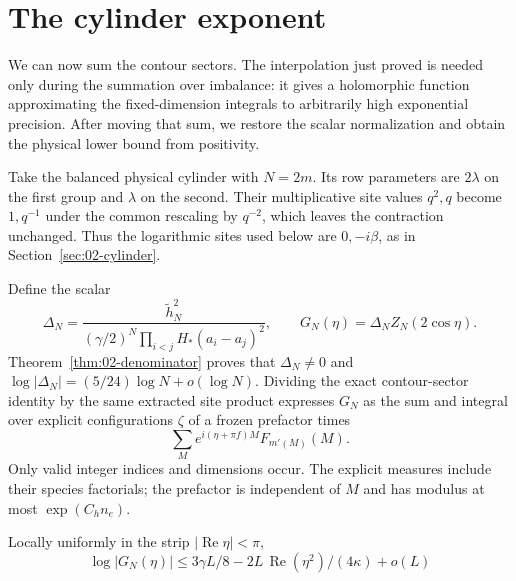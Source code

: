 \section{The cylinder exponent}\label{sec:E-cylinder-exponent}

We can now sum the contour sectors. The interpolation just proved is
needed only during the summation over imbalance: it gives a holomorphic
function approximating the fixed-dimension integrals to arbitrarily high
exponential precision. After moving that sum, we restore the scalar
normalization and obtain the physical lower bound from positivity.


Take the balanced physical cylinder with \(N=2m\). Its row
parameters are \(2\lambda\) on the first group and \(\lambda\)
on the second. Their multiplicative site values \(q^2,q\) become
\(1,q^{-1}\) under the common rescaling by \(q^{-2}\), which leaves
the contraction unchanged. Thus the logarithmic sites used below are
\(0,-i\beta\), as in Section~\ref{sec:02-cylinder}.

Define the scalar
\begin{equation}\label{eq:04-physical-normalization}
 \Delta_N=
 \frac{\widetilde h_N^2}
 { (\gamma/2)^N\prod_{i<j}H_*(a_i-a_j)^2},
 \qquad G_N(\eta)=\Delta_N Z_N(2\cos\eta).
\end{equation}
Theorem~\ref{thm:02-denominator} proves that \(\Delta_N\ne0\) and
\(\log|\Delta_N|=(5/24)\log N+o(\log N)\). Dividing the exact
contour-sector identity by the same extracted site product expresses
\(G_N\) as the sum and integral over explicit configurations \(\zeta\)
of a frozen prefactor times
\begin{equation}
 \sum_M e^{i(\eta+\pi f)M}F_{m'(M)}(M).
 \label{eq:G-22}
\end{equation}
Only valid integer indices and dimensions occur. The explicit measures
include their species factorials; the prefactor is independent of
\(M\) and has modulus at most \(\exp(C_hn_e)\).

\begin{proposition}\label{prop:04-sector-sum}
Locally uniformly in the strip \(|\operatorname{Re}\eta|<\pi\),
\begin{equation}
 \log |G_N(\eta)|\le
 3\gamma L/8-2L\,\operatorname{Re}(\eta^2)/(4\kappa)+o(L)
 \label{eq:G-23}
\end{equation}
\end{proposition}

